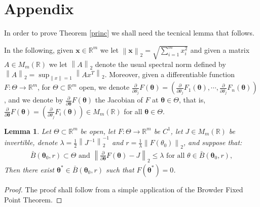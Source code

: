 \documentclass[10pt,a4paper,onecolumn]{article} %
\newtheorem{lemma}[theorem]{Lemma}
\newcommand{\R}{\mathbb{R}}
\newcommand{\bs}{\boldsymbol}
\begin{document}
\section*{Appendix}
\begin{appendix}


In order to prove Theorem \ref{princ} we shall need the tecnical lemma that follows.

In the following, given $\bs{x}\in \R^m$ we let $\left\|\bs{x}\right\|_2=\sqrt{\sum_{i=1}^m x_i^2}$ and given a matrix $A\in M_m(\R)$ we let $\left\|A\right\|_2$ denote the usual spectral norm defined by $\left\|A\right\|_2=\sup_{\left\|x\right\|=1}\left\|Ax^T\right\|_2$. Moreover, given a differentiable function $F:\Theta\to \mathbb{R}^m$, for $\Theta\subset \mathbb{R}^m$ open, we denote $\frac{\partial}{\partial \theta_j} F(\bs{\theta})=\left(\frac{\partial}{\partial \theta_j} F_1 (\bs{\theta}),\cdots,  \frac{\partial}{\partial \theta_j} F_n (\bs{\theta})\right)$, and we denote
 by $\frac{\partial}{\partial \bs{\theta}} F(\bs{\theta})$ the Jacobian of $F$ at $\bs{\theta}\in \Theta$, that is, $\frac{\partial}{\partial \bs{\theta}} F(\bs{\theta})=\left(\frac{\partial}{\partial \theta_j} F_i (\bs{\theta})\right)\in M_m(\mathbb{R})$ for all $\bs{\theta}\in \Theta$.
 
\begin{lemma}\label{clemma} Let $\Theta\subset \mathbb{R}^m$ be open, let $F:\Theta\to \mathbb{R}^m$ be $C^1$, let $J\in  M_m(\mathbb{R})$ be invertible, denote $\lambda = \frac{1}{2} \left\|J^{-1}\right\|_2^{-1}$ and $r=\frac{1}{\lambda}\left\|F(\theta_0)\right\|_2$, and suppose that:
\begin{equation*}
\begin{aligned}\bar{B}(\bs{\theta}_0,r)\subset \Theta\mbox{ and }
\left\|\frac{\partial}{\partial \bs{\theta}} F(\bs{\theta})-J\right\|_2\leq \lambda \mbox{ for all }\theta\in \bar{B}(\bs{\theta}_0,r),
\end{aligned}
\end{equation*}
Then there exist $\bs{\theta}^*\in \bar{B}(\bs{\theta}_0,r)$ such that $F(\bs{\theta}^*)=0$.
\end{lemma}

 \begin{proof} The proof shall follow from a simple application of the Browder Fixed Point Theorem.


\end{proof}
\end{appendix}
\end{document}
